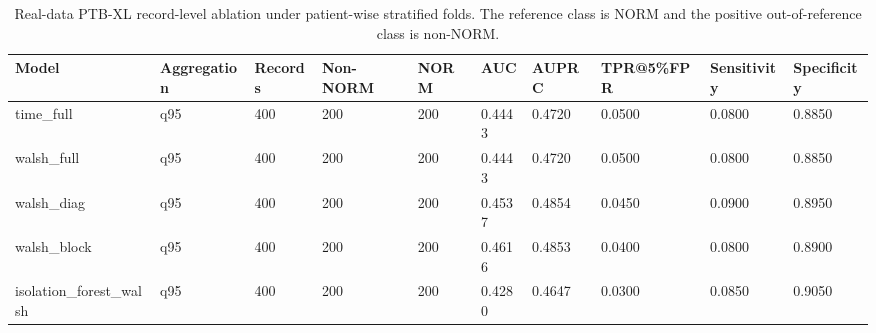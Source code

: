 \begin{table}[t]
\centering
\caption{Real-data PTB-XL record-level ablation under patient-wise stratified folds. The reference class is NORM and the positive out-of-reference class is non-NORM.}
\label{tab:ptbxl-real-ablation}
\begin{tabular}{llllllllll}
\hline
Model & Aggregation & Records & Non-NORM & NORM & AUC & AUPRC & TPR@5\%FPR & Sensitivity & Specificity \\
\hline
time_full & q95 & 400 & 200 & 200 & 0.4443 & 0.4720 & 0.0500 & 0.0800 & 0.8850 \\
walsh_full & q95 & 400 & 200 & 200 & 0.4443 & 0.4720 & 0.0500 & 0.0800 & 0.8850 \\
walsh_diag & q95 & 400 & 200 & 200 & 0.4537 & 0.4854 & 0.0450 & 0.0900 & 0.8950 \\
walsh_block & q95 & 400 & 200 & 200 & 0.4616 & 0.4853 & 0.0400 & 0.0800 & 0.8900 \\
isolation_forest_walsh & q95 & 400 & 200 & 200 & 0.4280 & 0.4647 & 0.0300 & 0.0850 & 0.9050 \\
\hline
\end{tabular}
\end{table}
